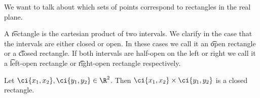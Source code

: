 

We want to talk about which sets of points correspond to rectangles in the real plane.


A \t{rectangle} is the cartesian product of two intervals.
We clarify in the case that the intervals are either closed or open.
In these cases we call it an \t{open rectangle} or a \t{closed rectangle}.
If both intervals are half-open on the left or right we call it a \t{left-open rectangle} or \t{right-open rectangle} respectively.


Let $\ci{x_1, x_2},\ci{y_1,y_2}\in\R ^2$.
Then $\ci{x_1, x_2} \times  \ci{y_1,y_2}$ is a closed rectangle.

\blankpage
